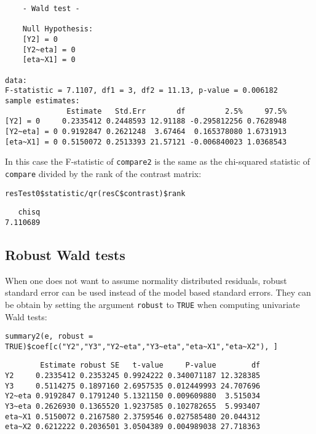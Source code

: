 \documentclass[12pt]{article}
\begin{document}
\begin{verbatim}
	- Wald test -

	Null Hypothesis:
	[Y2] = 0
	[Y2~eta] = 0
	[eta~X1] = 0

data:  
F-statistic = 7.1107, df1 = 3, df2 = 11.13, p-value = 0.006182
sample estimates:
              Estimate   Std.Err       df         2.5%     97.5%
[Y2] = 0     0.2335412 0.2448593 12.91188 -0.295812256 0.7628948
[Y2~eta] = 0 0.9192847 0.2621248  3.67464  0.165378080 1.6731913
[eta~X1] = 0 0.5150072 0.2513393 21.57121 -0.006840023 1.0368543
\end{verbatim}

In this case the F-statistic of \texttt{compare2} is the same as the
chi-squared statistic of \texttt{compare} divided by the rank of the contrast matrix:
\lstset{language=r,label= ,caption= ,captionpos=b,numbers=none}
\begin{lstlisting}
resTest0$statistic/qr(resC$contrast)$rank
\end{lstlisting}

\begin{verbatim}
   chisq 
7.110689
\end{verbatim}

\subsection{Robust Wald tests}
\label{sec:orgd7296ae}

When one does not want to assume normality distributed residuals,
robust standard error can be used instead of the model based standard
errors. They can be obtain by setting the argument \texttt{robust} to \texttt{TRUE}
when computing univariate Wald tests:
\lstset{language=r,label= ,caption= ,captionpos=b,numbers=none}
\begin{lstlisting}
summary2(e, robust = TRUE)$coef[c("Y2","Y3","Y2~eta","Y3~eta","eta~X1","eta~X2"), ]
\end{lstlisting}

\begin{verbatim}
        Estimate robust SE   t-value     P-value        df
Y2     0.2335412 0.2353245 0.9924222 0.340071187 12.328385
Y3     0.5114275 0.1897160 2.6957535 0.012449993 24.707696
Y2~eta 0.9192847 0.1791240 5.1321150 0.009609880  3.515034
Y3~eta 0.2626930 0.1365520 1.9237585 0.102782655  5.993407
eta~X1 0.5150072 0.2167580 2.3759546 0.027585480 20.044312
eta~X2 0.6212222 0.2036501 3.0504389 0.004989038 27.718363
\end{verbatim}
\end{document}
